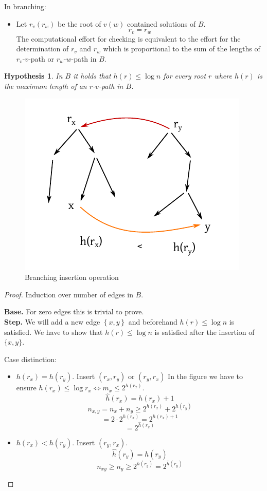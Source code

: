\documentclass{article}
\newtheorem*{hypothesis}{Hypothesis}
\newcommand{\set}[1]{\left\{#1\right\}}
\newcommand{\gath}[2]{$#1$-$#2$-path} %
\begin{document}
In branching:
\begin{itemize}
  \item Let $r_v(r_w)$ be the root of $v(w)$ contained solutions of $B$.
    \[
      r_v = r_w
    \]
    The computational effort for checking is equivalent to the effort for the determination of $r_v$ and $r_w$
    which is proportional to the sum of the lengths of \gath{r_v}{v} or \gath{r_w}{w} in $B$.
\end{itemize}

\begin{hypothesis}
  In $B$ it holds that $h(r) \leq \log{n}$ for every root $r$ where $h(r)$ is the maximum length of an \gath rv in $B$.
\end{hypothesis}

\begin{figure}[ht]
  \begin{center}
    \includegraphics{img/branching_insertion.pdf}
    \caption{Branching insertion operation}
  \end{center}
\end{figure}

\begin{proof}
  Induction over number of edges in $B$.

  \textbf{Base.} For zero edges this is trivial to prove. \\
  \textbf{Step.}
    We will add a new edge $\set{x, y}$ and beforehand $h(r) \leq \log{n}$ is satisfied.
    We have to show that $h(r) \leq \log{n}$ is satisfied after the insertion of $\{x, y\}$.

    Case distinction:
    \begin{itemize}
      \item $h(r_x) = h(r_y)$. Insert $(r_x, r_y)$ or $(r_y, r_x)$
        In the figure we have to ensure $h(r_x) \leq \log{r_x} \Leftrightarrow m_x \leq 2^{h(r_x)}$.
        \[
          \hat h(r_x) = h(r_x) + 1
        \] \[
          n_{x,y} = n_x + n_y \geq 2^{h(r_x)} + 2^{h(r_y)}
        \] \[
          = 2 \cdot 2^{h(r_x)} = 2^{h(r_x) + 1}
        \] \[
          = 2^{\hat h(r_x)}
        \]
      \item $h(r_x) < h(r_y)$. Insert $(r_y, r_x)$.
        \[
          \hat h(r_y) = h(r_y)
        \] \[
          n_{xy} \geq n_y \geq 2^{h(r_y)} = 2^{\hat h(r_y)}
        \]
    \end{itemize}
\end{proof}
\end{document}
